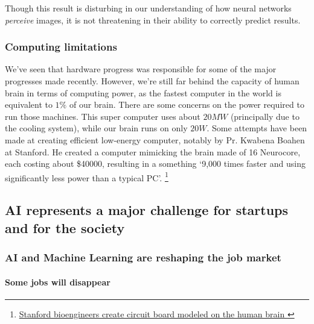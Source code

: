 \documentclass[12pt]{article}
\begin{document}
Though this result is disturbing in our understanding of how neural networks \textit{perceive}
images, it is not threatening in their ability to correctly predict results.

\subsubsection{Computing limitations}

We've seen that hardware progress was responsible for some of the major
progresses  made recently. However, we're still far behind the capacity of human
brain in terms of computing power, as the fastest computer in the world is
equivalent to $1\%$ of  our brain. There are some concerns on the power required
to run those machines. This super computer uses about $20MW$
(principally due to the cooling system), while our brain runs on only $20 W$.
Some
attempts have been made at creating efficient low-energy computer, notably by
Pr. Kwabena Boahen at Stanford. He created a computer mimicking the brain made
of 16 Neurocore, each costing about \$40000,  resulting in a something \lq 9,000
times faster and using significantly less power than a typical PC\rq.
\footnote{\href{http://news.stanford.edu/news/2014/april/neurogrid-boahen-engineering-042814.html}{Stanford
bioengineers create circuit board modeled on the human brain }}

\pagebreak

\subsection{AI represents a major challenge for startups and for the society}

\subsubsection{AI and Machine Learning are reshaping the job market}

\paragraph{Some jobs will disappear}
\end{document}
